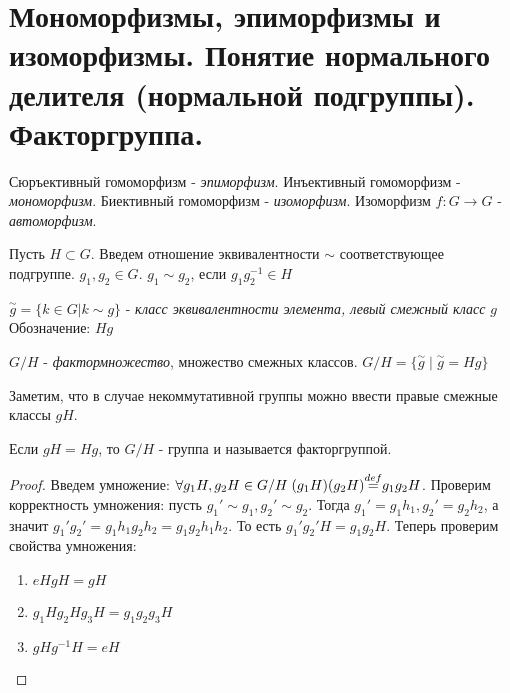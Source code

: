 \section{Мономорфизмы, эпиморфизмы и изоморфизмы. Понятие нормального делителя (нормальной подгруппы). Факторгруппа.}

\begin{defn}
  Сюръективный гомоморфизм - \emph{эпиморфизм}. \newline
  Инъективный гомоморфизм - \emph{мономорфизм}. \newline
  Биективный гомоморфизм - \emph{изоморфизм}. \newline
  Изоморфизм $ f: G \rightarrow G $ - \emph{автоморфизм}. \newline
\end{defn}

Пусть $ H \subset G $. Введем отношение эквивалентности $ \sim $ соответствующее подгруппе. $ g_1, g_2 \in G $. $ g_1 \sim g_2 $, если $ g_{1}g_{2}^{-1} \in H $

\begin{defn}
  $  \overset{\sim}{g} = \{ k \in G | k \sim g\} $ - \emph{класс эквивалентности элемента, левый смежный класс} $g$ \newline
  Обозначение: $ Hg $
\end{defn}

\begin{defn}
  $ G/H $ - \emph{фактормножество}, множество смежных классов. $ G/H = \{ \overset{\sim}{g} \; | \; \overset{\sim}{g} = Hg \} $ 
\end{defn}

Заметим, что в случае некоммутативной группы можно ввести правые смежные классы $ gH $.

\begin{thm}
  Если $ gH = Hg $, то $ G/H $ - группа и называется факторгруппой.
\end{thm}

\begin{proof}  
  Введем умножение: $ \forall g_{1}H, g_{2}H \in G/H \; (g_{1}H)(g_{2}H){\buildrel{def}\over{=}}g_{1}g_{2}H $.
  Проверим корректность умножения: пусть $ g_1' \sim g_1, g_2' \sim g_2 $. Тогда
  $ g_1' = g_{1}h_1, g_2' = g_{2}h_2 $, а значит $ g_{1}'g_{2}'= g_{1}h_{1}g_{2}h_{2} = g_{1}g_{2}h_{1}h_{2} $. 
  То есть $ g_{1}'g_{2}'H = g_{1}g_{2}H $. \newline
  Теперь проверим свойства умножения: 
  \begin{enumerate}
    \item $ eHgH = gH $
    \item $ g_{1}Hg_{2}Hg_{3}H = g_{1}g_{2}g_{3}H $
    \item $ gHg^{-1}H = eH $
  \end{enumerate}
\end{proof}

